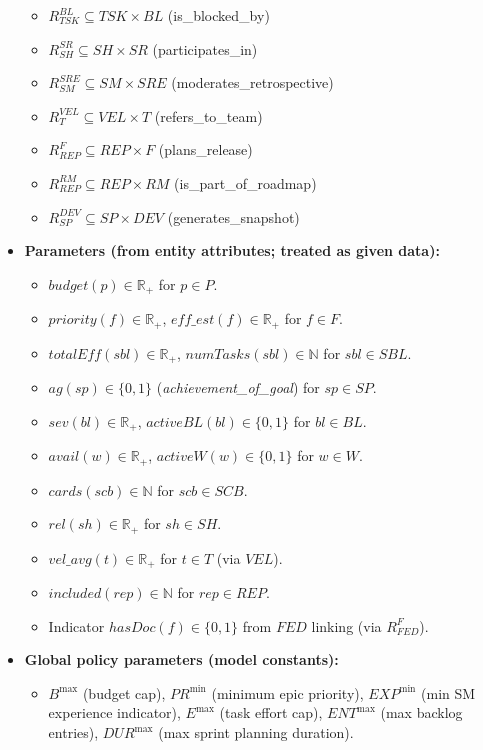 \documentclass[11pt,a4paper]{article}
\begin{document}
\begin{itemize}[leftmargin=2em]
\begin{itemize}
    \item $R^{BL}_{TSK} \subseteq TSK \times BL$ (\textsf{is\_blocked\_by})
    \item $R^{SR}_{SH} \subseteq SH \times SR$ (\textsf{participates\_in})
    \item $R^{SRE}_{SM} \subseteq SM \times SRE$ (\textsf{moderates\_retrospective})
    \item $R^{VEL}_{T} \subseteq VEL \times T$ (\textsf{refers\_to\_team})
    \item $R^{F}_{REP} \subseteq REP \times F$ (\textsf{plans\_release})
    \item $R^{RM}_{REP} \subseteq REP \times RM$ (\textsf{is\_part\_of\_roadmap})
    \item $R^{DEV}_{SP} \subseteq SP \times DEV$ (\textsf{generates\_snapshot})
  \end{itemize}

\item \textbf{Parameters (from entity attributes; treated as given data):}
  \begin{itemize}
    \item $budget(p)\in\mathbb{R}_{+}$ for $p\in P$.
    \item $priority(f)\in\mathbb{R}_{+}$, $eff\_est(f)\in\mathbb{R}_{+}$ for $f\in F$.
    \item $totalEff(sbl)\in\mathbb{R}_{+}$, $numTasks(sbl)\in\mathbb{N}$ for $sbl\in SBL$.
    \item $ag(sp)\in\{0,1\}$ (\emph{achievement\_of\_goal}) for $sp\in SP$.
    \item $sev(bl)\in\mathbb{R}_{+}$, $activeBL(bl)\in\{0,1\}$ for $bl\in BL$.
    \item $avail(w)\in\mathbb{R}_{+}$, $activeW(w)\in\{0,1\}$ for $w\in W$.
    \item $cards(scb)\in\mathbb{N}$ for $scb\in SCB$.
    \item $rel(sh)\in\mathbb{R}_{+}$ for $sh\in SH$.
    \item $vel\_avg(t)\in\mathbb{R}_{+}$ for $t\in T$ (via $VEL$).
    \item $included(rep)\in\mathbb{N}$ for $rep\in REP$.
    \item Indicator $hasDoc(f)\in\{0,1\}$ from $FED$ linking (via $R^{F}_{FED}$).
  \end{itemize}

\item \textbf{Global policy parameters (model constants):}
  \begin{itemize}
    \item $B^{\max}$ (budget cap), $PR^{\min}$ (minimum epic priority), $EXP^{\min}$ (min SM experience indicator), $E^{\max}$ (task effort cap), $ENT^{\max}$ (max backlog entries), $DUR^{\max}$ (max sprint planning duration).
  \end{itemize}

\end{itemize}
\end{document}
